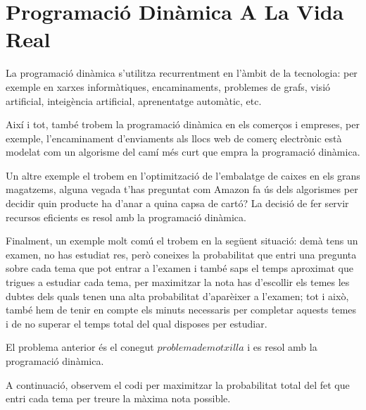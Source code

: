 \section{Programació Dinàmica A La Vida Real}

La programació dinàmica s'utilitza recurrentment en l'àmbit de la tecnologia: per exemple en xarxes informàtiques, encaminaments, problemes de grafs, visió artificial, inte\lgem igència artificial, aprenentatge automàtic, etc.

Així i tot, també trobem la programació dinàmica en els comerços i empreses, per exemple, l'encaminament d'enviaments als llocs web de comerç electrònic està modelat com un algorisme del camí més curt que empra la programació dinàmica.

Un altre exemple el trobem en l'optimització de l'embalatge de caixes en els grans magatzems, alguna vegada t'has preguntat com Amazon fa ús dels algorismes per decidir quin producte ha d'anar a quina capsa de cartó? La decisió de fer servir recursos eficients es resol amb la programació dinàmica.

Finalment, un exemple molt comú el trobem en la següent situació: demà tens un examen, no has estudiat res, però coneixes la probabilitat que entri una pregunta sobre cada tema que pot entrar a l'examen i també saps el temps aproximat que trigues a estudiar cada tema, per maximitzar la nota has d'escollir els temes les dubtes dels quals tenen una alta probabilitat d'aparèixer a l'examen; tot i això, també hem de tenir en compte els minuts necessaris per completar aquests temes i de no superar el temps total del qual disposes per estudiar.

El problema anterior és el conegut $problema de motxilla$ i es resol amb la programació dinàmica.

A continuació, observem el codi per maximitzar la probabilitat total del fet que entri cada tema per treure la màxima nota possible. \newline

